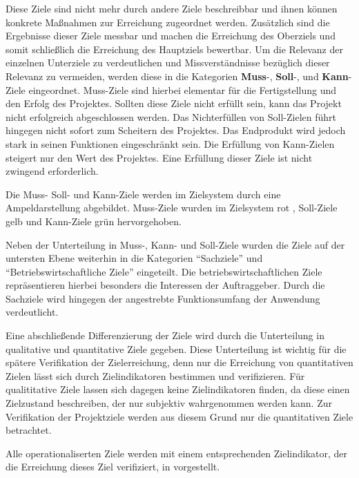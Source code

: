 Diese Ziele sind nicht mehr durch andere Ziele beschreibbar und 
ihnen können konkrete Maßnahmen zur Erreichung zugeordnet werden. Zusätzlich sind die
Ergebnisse dieser Ziele messbar und machen die Erreichung des Oberziels und
somit schließlich die Erreichung des Hauptziels bewertbar. Um die Relevanz der
einzelnen Unterziele zu verdeutlichen und Missverständnisse bezüglich dieser
Relevanz zu vermeiden, werden diese in die Kategorien \textbf{Muss}-, \textbf{Soll}-, und
\textbf{Kann}-Ziele eingeordnet. 
Muss-Ziele sind hierbei elementar für die
Fertigstellung und den Erfolg des Projektes. Sollten diese Ziele nicht erfüllt
sein, kann das Projekt nicht erfolgreich abgeschlossen werden. Das Nichterfüllen von Soll-Zielen führt
hingegen nicht sofort zum Scheitern des Projektes. Das Endprodukt wird jedoch
stark in seinen Funktionen eingeschränkt sein. Die Erfüllung von Kann-Zielen
steigert nur den Wert des Projektes. Eine Erfüllung dieser Ziele ist nicht
zwingend erforderlich.

Die Muss- Soll- und Kann-Ziele werden im Zielsystem durch eine Ampeldarstellung
abgebildet. Muss-Ziele wurden im Zielsystem rot , Soll-Ziele gelb und 
Kann-Ziele grün hervorgehoben.

Neben der Unterteilung in Muss-, Kann- und Soll-Ziele wurden die Ziele auf der
untersten Ebene weiterhin in die Kategorien "`Sachziele"' und
"`Betriebswirtschaftliche Ziele"' eingeteilt. Die betriebswirtschaftlichen
Ziele repräsentieren hierbei besonders die Interessen der Auftraggeber. Durch
die Sachziele wird hingegen der angestrebte Funktionsumfang der Anwendung
verdeutlicht.

Eine abschließende Differenzierung der Ziele wird durch die Unterteilung 
in qualitative und quantitative Ziele gegeben. Diese Unterteilung ist wichtig
für die spätere Verifikation der Zielerreichung, denn nur die Erreichung von quantitativen
Zielen lässt sich durch Zielindikatoren bestimmen und verifizieren. 
Für qualititative Ziele lassen sich dagegen keine Zielindikatoren
finden, da diese einen Zielzustand beschreiben, der nur subjektiv wahrgenommen werden kann.
Zur Verifikation der Projektziele werden aus diesem Grund nur die quantitativen Ziele betrachtet.

Alle operationaliserten Ziele werden mit einem entsprechenden Zielindikator, der die Erreichung dieses
Ziel verifiziert, in  vorgestellt.